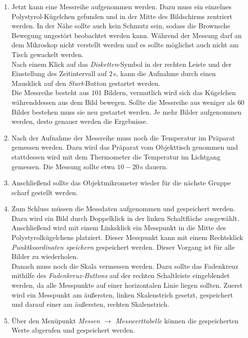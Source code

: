 \begin{enumerate}
  \item Jetzt kann eine Messreihe aufgenommen werden. Dazu muss ein einzelnes Polystyrol-Kügelchen gefunden und in der Mitte des Bildschirms zentriert werden. In der Nähe sollte auch kein Schmutz sein, sodass die Brownsche Bewegung ungestört beobachtet werden kann. Während der Messung darf an dem Mikroskop nicht verstellt werden und es sollte möglichst auch nicht am Tisch gewackelt werden.\\
  Nach einem Klick auf das \emph{Disketten}-Symbol in der rechten Leiste und der Einstellung des Zeitintervall  auf $2 \,$s, kann die Aufnahme durch einen Mausklick auf den \emph{Start}-Button gestartet werden.\\
  Die Messreihe besteht aus $101$ Bildern, vermutlich wird sich das Kügelchen währenddessen aus dem Bild bewegen. Sollte die Messreihe aus weniger als $60$ Bilder bestehen muss sie neu gestartet werden. Je mehr Bilder aufgenommen werden, desto genauer werden die Ergebnisse.

  \item Nach der Aufnahme der Messreihe muss noch die Temperatur im Präparat gemessen werden. Dazu wird das Präparat vom Objekttisch genommen und stattdessen wird mit dem Thermometer die Temperatur im Lichtgang gemessen. Die Messung sollte etwa $10 - 20\,$s dauern.

  \item Anschließend sollte das Objektmikrometer wieder für die nächste Gruppe scharf gestellt werden.

  \item Zum Schluss müssen die Messdaten aufgenommen und gespeichert werden.
  Dazu wird ein Bild durch Doppelklick in der linken Schaltfläche ausgewählt. Anschließend wird mit einem Linksklick ein Messpunkt in die Mitte des Polystyrolkügelchens platziert. Dieser Messpunkt kann mit einem Rechtsklick \emph{Punktkoordinaten speichern} gespeichert werden. Dieser Vorgang ist für alle Bilder zu wiederholen.\\
  Danach muss noch die Skala vermessen werden. Dazu sollte das Fadenkreuz mithilfe des \emph{Fadenkreuz-Buttons} auf der rechten Schaltleiste eingeblendet werden, da alle Messpunkte auf einer horizontalen Linie liegen sollten. Zuerst wird ein Messpunkt am äußersten, linken Skalenstrich gesetzt, gespeichert und darauf einer am äußersten, rechten Skalenstrich.\\

  \item Über den Menüpunkt \emph{Messen $\rightarrow$ Messwerttabelle} können die gespeicherten Werte abgerufen und gespeichert werden.

\end{enumerate}
